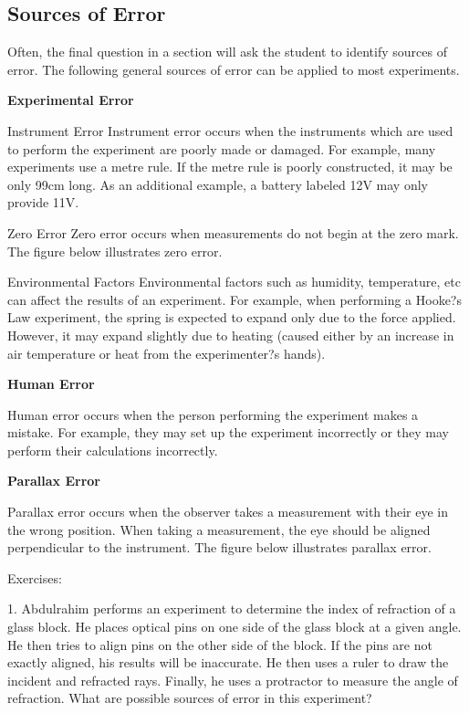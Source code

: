 \subsection{Sources of Error}

Often, the final question in a section will ask the student to identify sources of error. The following general sources of error can be applied to most experiments.

\textbf{Experimental Error}

Instrument Error
Instrument error occurs when the instruments which are used to perform the experiment are poorly made or damaged. For example, many experiments use a metre rule. If the metre rule is poorly constructed, it may be only 99cm long. As an additional example, a battery labeled 12V may only provide 11V.

Zero Error
Zero error occurs when measurements do not begin at the zero mark. The figure below illustrates zero error.

Environmental Factors
Environmental factors such as humidity, temperature, etc can affect the results of an experiment. For example, when performing a Hooke?s Law experiment, the spring is expected to expand only due to the force applied. However, it may expand slightly due to heating (caused either by an increase in air temperature or heat from the experimenter?s hands).

\textbf{Human Error}

Human error occurs when the person performing the experiment makes a mistake. For example, they may set up the experiment incorrectly or they may perform their calculations incorrectly.

\textbf{ Parallax Error}

Parallax error occurs when the observer takes a measurement with their eye in the wrong position. When taking a measurement, the eye should be aligned perpendicular to the instrument. The figure below illustrates parallax error.

Exercises:

1. Abdulrahim performs an experiment to determine the index of refraction of a glass block. He places optical pins on one side of the glass block at a given angle. He then tries to align pins on the other side of the block. If the pins are not exactly aligned, his results will be inaccurate. He then uses a ruler to draw the incident and refracted rays. Finally, he uses a protractor to measure the angle of refraction. What are possible sources of error in this experiment?

%
%
%
%
%
%
%
%
